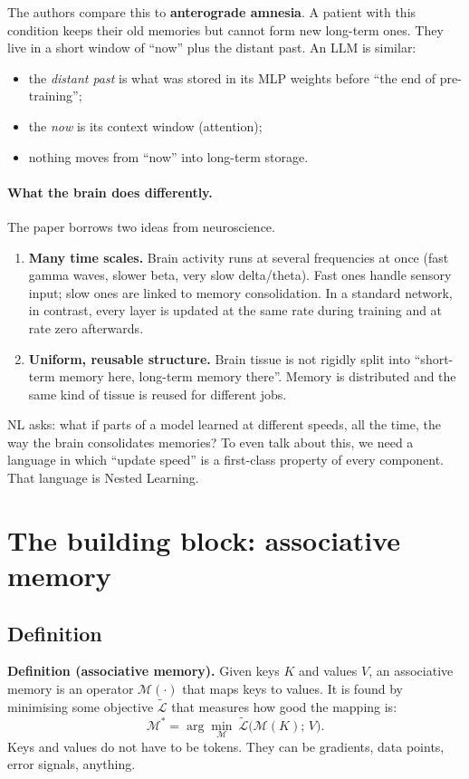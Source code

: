 \documentclass[11pt,a4paper]{article}
\newcommand{\M}{\mathcal{M}}
\newcommand{\Lt}{\tilde{\mathcal{L}}}
\begin{document}
The authors compare this to \textbf{anterograde amnesia}. A patient with this condition keeps their old memories but cannot form new long-term ones. They live in a short window of ``now'' plus the distant past. An LLM is similar:
\begin{itemize}
  \item the \emph{distant past} is what was stored in its MLP weights before ``the end of pre-training'';
  \item the \emph{now} is its context window (attention);
  \item nothing moves from ``now'' into long-term storage.
\end{itemize}

\paragraph{What the brain does differently.}
The paper borrows two ideas from neuroscience.
\begin{enumerate}
  \item \textbf{Many time scales.} Brain activity runs at several frequencies at once (fast gamma waves, slower beta, very slow delta/theta). Fast ones handle sensory input; slow ones are linked to memory consolidation. In a standard network, in contrast, every layer is updated at the same rate during training and at rate zero afterwards.
  \item \textbf{Uniform, reusable structure.} Brain tissue is not rigidly split into ``short-term memory here, long-term memory there''. Memory is distributed and the same kind of tissue is reused for different jobs.
\end{enumerate}

\begin{plain}
NL asks: what if parts of a model learned at different speeds, all the time, the way the brain consolidates memories? To even talk about this, we need a language in which ``update speed'' is a first-class property of every component. That language is Nested Learning.
\end{plain}

\section{The building block: associative memory}

\subsection{Definition}
\textbf{Definition (associative memory).} Given keys $K$ and values $V$, an associative memory is an operator $\M(\cdot)$ that maps keys to values. It is found by minimising some objective $\Lt$ that measures how good the mapping is:
\begin{equation}
  \M^{*} = \arg\min_{\M}\ \Lt\big(\M(K);\,V\big).
\end{equation}
Keys and values do not have to be tokens. They can be gradients, data points, error signals, anything.
\end{document}
